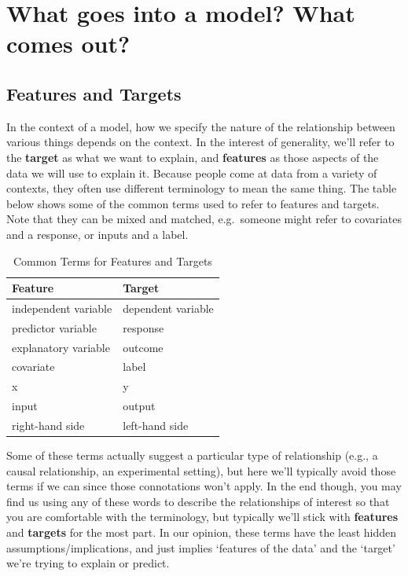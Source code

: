 \documentclass[
  letterpaper,
]{krantz}
\begin{document}
\section{What goes into a model? What comes
out?}\label{sec-lm-in-a-model}

\subsection{Features and Targets}\label{sec-lm-features-targets}

In the context of a model, how we specify the nature of the relationship
between various things depends on the context. In the interest of
generality, we'll refer to the \textbf{target} as what we want to
explain, and \textbf{features} as those aspects of the data we will use
to explain it. Because people come at data from a variety of contexts,
they often use different terminology to mean the same thing. The table
below shows some of the common terms used to refer to features and
targets. Note that they can be mixed and matched, e.g.~someone might
refer to covariates and a response, or inputs and a label.

\begin{longtable}{ll}

\caption{\label{tbl-feature-target-names}Common Terms for Features and
Targets}

\tabularnewline

\toprule
Feature & Target \\ 
\midrule\addlinespace[2.5pt]
independent variable & dependent variable \\ 
predictor variable & response \\ 
explanatory variable & outcome \\ 
covariate & label \\ 
x & y \\ 
input & output \\ 
right-hand side & left-hand side \\ 
\bottomrule

\end{longtable}

Some of these terms actually suggest a particular type of relationship
(e.g., a causal relationship, an experimental setting), but here we'll
typically avoid those terms if we can since those connotations won't
apply. In the end though, you may find us using any of these words to
describe the relationships of interest so that you are comfortable with
the terminology, but typically we'll stick with \textbf{features} and
\textbf{targets} for the most part. In our opinion, these terms have the
least hidden assumptions/implications, and just implies `features of the
data' and the `target' we're trying to explain or predict.
\end{document}
